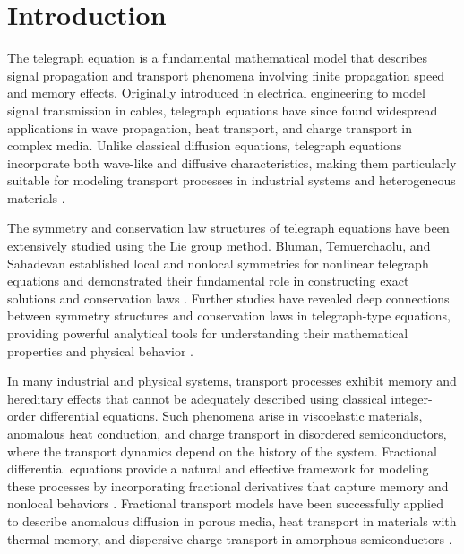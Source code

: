 \documentclass[12pt]{amsart}
\begin{document}
\maketitle


\section{Introduction}

The telegraph equation is a fundamental mathematical model that describes signal propagation and transport phenomena involving finite propagation speed and memory effects. Originally introduced in electrical engineering to model signal transmission in cables, telegraph equations have since found widespread applications in wave propagation, heat transport, and charge transport in complex media. Unlike classical diffusion equations, telegraph equations incorporate both wave-like and diffusive characteristics, making them particularly suitable for modeling transport processes in industrial systems and heterogeneous materials \cite{Kac1974, OrsingherBeghin2004}.

The symmetry and conservation law structures of telegraph equations have been extensively studied using the Lie group method. Bluman, Temuerchaolu, and Sahadevan established local and nonlocal symmetries for nonlinear telegraph equations and demonstrated their fundamental role in constructing exact solutions and conservation laws \cite{BlumanTemuerchaoluSahadevan2005}. Further studies have revealed deep connections between symmetry structures and conservation laws in telegraph-type equations, providing powerful analytical tools for understanding their mathematical properties and physical behavior \cite{BlumanTemuerchaolu2005JMAA, BlumanTemuerchaolu2005JMP}.

In many industrial and physical systems, transport processes exhibit memory and hereditary effects that cannot be adequately described using classical integer-order differential equations. Such phenomena arise in viscoelastic materials, anomalous heat conduction, and charge transport in disordered semiconductors, where the transport dynamics depend on the history of the system. Fractional differential equations provide a natural and effective framework for modeling these processes by incorporating fractional derivatives that capture memory and nonlocal behaviors \cite{Podlubny1999, MillerRoss1993, Mainardi2010, MetzlerKlafter2000}. Fractional transport models have been successfully applied to describe anomalous diffusion in porous media, heat transport in materials with thermal memory, and dispersive charge transport in amorphous semiconductors \cite{ScherMontroll1975, HenryWearne2000}.
\end{document}
